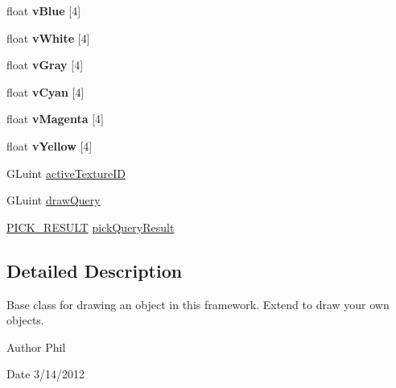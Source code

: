 \begin{DoxyCompactItemize}
\item 
\hypertarget{class_drawable_object_a6ed3d2e5960ed50a2757c163dee6b9d9}{float {\bfseries v\-Blue} \mbox{[}4\mbox{]}}\label{class_drawable_object_a6ed3d2e5960ed50a2757c163dee6b9d9}

\item 
\hypertarget{class_drawable_object_a588e9b3d9b42c3691fcf6010539d0bf3}{float {\bfseries v\-White} \mbox{[}4\mbox{]}}\label{class_drawable_object_a588e9b3d9b42c3691fcf6010539d0bf3}

\item 
\hypertarget{class_drawable_object_acc95879a203d50e7cdd57f2dc8d4f1c5}{float {\bfseries v\-Gray} \mbox{[}4\mbox{]}}\label{class_drawable_object_acc95879a203d50e7cdd57f2dc8d4f1c5}

\item 
\hypertarget{class_drawable_object_a50fd69dcfc1bf0aef2826639f81a6b8b}{float {\bfseries v\-Cyan} \mbox{[}4\mbox{]}}\label{class_drawable_object_a50fd69dcfc1bf0aef2826639f81a6b8b}

\item 
\hypertarget{class_drawable_object_a4e6338baf560b3d877a883f18d9ca9a5}{float {\bfseries v\-Magenta} \mbox{[}4\mbox{]}}\label{class_drawable_object_a4e6338baf560b3d877a883f18d9ca9a5}

\item 
\hypertarget{class_drawable_object_a4eda839cb3b066c9c6bce0f8e10c0855}{float {\bfseries v\-Yellow} \mbox{[}4\mbox{]}}\label{class_drawable_object_a4eda839cb3b066c9c6bce0f8e10c0855}

\item 
G\-Luint \hyperlink{class_drawable_object_af80893517e95399841e8c9c0a632584d}{active\-Texture\-I\-D}
\item 
G\-Luint \hyperlink{class_drawable_object_aebc658d36b01bd8f5baa153b6d77652b}{draw\-Query}
\item 
\hyperlink{class_drawable_object_aa5a991e086b6d0a74bd538d69570da93}{P\-I\-C\-K\-\_\-\-R\-E\-S\-U\-L\-T} \hyperlink{class_drawable_object_a642edc6bff786dcfc46de84baabce189}{pick\-Query\-Result}
\end{DoxyCompactItemize}


\subsection{Detailed Description}
Base class for drawing an object in this framework. Extend to draw your own objects. 

\begin{DoxyAuthor}{Author}
Phil 
\end{DoxyAuthor}
\begin{DoxyDate}{Date}
3/14/2012 
\end{DoxyDate}


